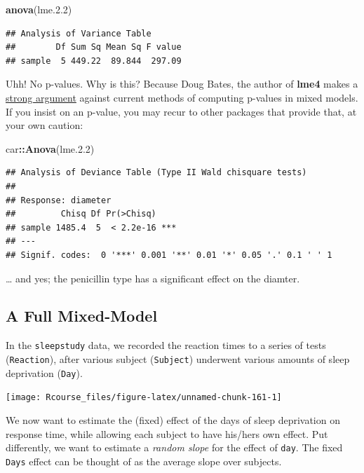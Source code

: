 \documentclass[]{book}
\newenvironment{Shaded}{\begin{snugshade}}{\end{snugshade}}
\newcommand{\KeywordTok}[1]{\textcolor[rgb]{0.13,0.29,0.53}{\textbf{#1}}}
\newcommand{\FloatTok}[1]{\textcolor[rgb]{0.00,0.00,0.81}{#1}}
\newcommand{\OperatorTok}[1]{\textcolor[rgb]{0.81,0.36,0.00}{\textbf{#1}}}
\newcommand{\NormalTok}[1]{#1}
\theoremstyle{definition}
\theoremstyle{definition}
\theoremstyle{definition}
\theoremstyle{remark}
\begin{document}
\begin{Shaded}
\begin{Highlighting}[]
\KeywordTok{anova}\NormalTok{(lme.}\FloatTok{2.2}\NormalTok{)}
\end{Highlighting}
\end{Shaded}

\begin{verbatim}
## Analysis of Variance Table
##        Df Sum Sq Mean Sq F value
## sample  5 449.22  89.844  297.09
\end{verbatim}

Uhh! No p-values. Why is this? Because Doug Bates, the author of
\textbf{lme4} makes a
\href{https://stat.ethz.ch/pipermail/r-help/2006-May/094765.html}{strong
argument} against current methods of computing p-values in mixed models.
If you insist on an p-value, you may recur to other packages that
provide that, at your own caution:

\begin{Shaded}
\begin{Highlighting}[]
\NormalTok{car}\OperatorTok{::}\KeywordTok{Anova}\NormalTok{(lme.}\FloatTok{2.2}\NormalTok{) }
\end{Highlighting}
\end{Shaded}

\begin{verbatim}
## Analysis of Deviance Table (Type II Wald chisquare tests)
## 
## Response: diameter
##         Chisq Df Pr(>Chisq)    
## sample 1485.4  5  < 2.2e-16 ***
## ---
## Signif. codes:  0 '***' 0.001 '**' 0.01 '*' 0.05 '.' 0.1 ' ' 1
\end{verbatim}

\ldots{} and yes; the penicillin type has a significant effect on the
diamter.

\subsection{A Full Mixed-Model}\label{a-full-mixed-model}

In the \texttt{sleepstudy} data, we recorded the reaction times to a
series of tests (\texttt{Reaction}), after various subject
(\texttt{Subject}) underwent various amounts of sleep deprivation
(\texttt{Day}).

\texttt{[image: Rcourse\_files/figure-latex/unnamed-chunk-161-1]}

We now want to estimate the (fixed) effect of the days of sleep
deprivation on response time, while allowing each subject to have
his/hers own effect. Put differently, we want to estimate a \emph{random
slope} for the effect of \texttt{day}. The fixed \texttt{Days} effect
can be thought of as the average slope over subjects.
\end{document}
